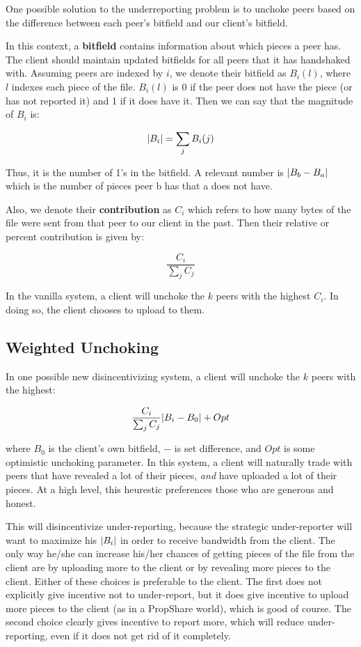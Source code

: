 One possible solution to the underreporting problem is to unchoke peers based on the difference between each peer's bitfield and our client's bitfield.

In this context, a \textbf{bitfield} contains information about which pieces a peer has. The client should maintain updated bitfields for all peers that it has handshaked with. Assuming peers are indexed by $i$, we denote their bitfield as $B_i(l)$, where $l$ indexes each piece of the file. $B_i(l)$ is 0 if the peer does not have the piece (or has not reported it) and 1 if it does have it. Then we can say that the magnitude of $B_i$ is:

$$ \lvert B_i\rvert = \sum_j B_i(j) $$

Thus, it is the number of 1's in the bitfield. A relevant number is $\lvert B_b - B_a\rvert$ which is the number of pieces peer b has that a does not have.

Also, we denote their \textbf{contribution} as $C_i$ which refers to how many bytes of the file were sent from that peer to our client in the past. Then their relative or percent contribution is given by:

$$ \frac{C_i}{\sum_{j}C_j} $$

In the vanilla system, a client will unchoke the $k$ peers with the highest $C_i$. In doing so, the client chooses to upload to them.

\subsection{Weighted Unchoking}

In one possible new disincentivizing system, a client will unchoke the $k$ peers with the highest:

$$\frac{C_i}{\sum_{j}C_j}\lvert B_i - B_0\rvert + Opt$$

\noindent where $B_0$ is the client's own bitfield, $-$ is set difference, and $Opt$ is some optimistic unchoking parameter. In this system, a client will naturally trade with peers that have revealed a lot of their pieces, \emph{and} have uploaded a lot of their pieces. At a high level, this heurestic preferences those who are generous and honest.

This will disincentivize under-reporting, because the strategic under-reporter will want to maximize his $\lvert B_i\rvert$ in order to receive bandwidth from the client. The only way he/she can increase his/her chances of getting pieces of the file from the client are by uploading more to the client or by revealing more pieces to the client. Either of these choices is preferable to the client. The first does not explicitly give incentive not to under-report, but it does give incentive to upload more pieces to the client (as in a PropShare world), which is good of course. The second choice clearly gives incentive to report more, which will reduce under-reporting, even if it does not get rid of it completely.


